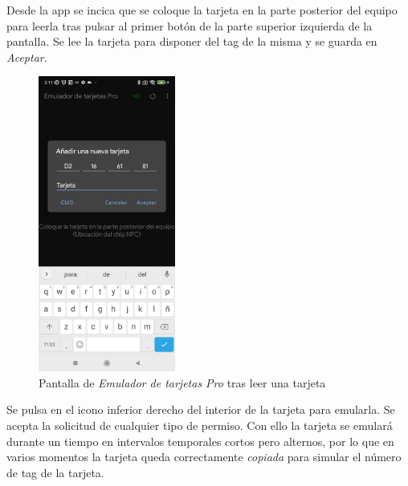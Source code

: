 \documentclass[12pt,a4paper,onecolumn,oneside]{report}
\begin{document}
Desde la app se incica que se coloque la tarjeta en la parte posterior del equipo para leerla tras pulsar al primer botón de la parte superior izquierda de la pantalla. Se lee la tarjeta para disponer del tag de la misma y se guarda en \textit{Aceptar}.


\begin{figure}[h] 
\centering
  \includegraphics[width=0.4\textwidth]{figuras/root7.png}
  \caption[Pantalla de \textit{Emulador de tarjetas Pro} tras leer una tarjeta]{Pantalla de \textit{Emulador de tarjetas Pro} tras leer una tarjeta\\
  }
  \label{fig:root7}
\end{figure}

Se pulsa en el icono inferior derecho del interior de la tarjeta para emularla. Se acepta la solicitud de cualquier tipo de permiso. Con ello la tarjeta se emulará durante un tiempo en intervalos temporales cortos pero alternos, por lo que en varios momentos la tarjeta queda correctamente \textit{copiada} para simular el número de tag de la tarjeta.
\end{document}

